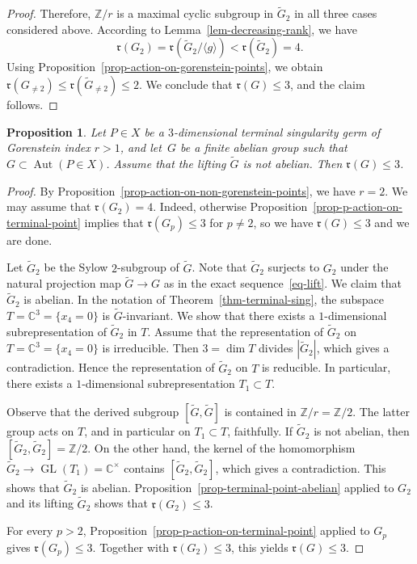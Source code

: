 \documentclass[11pt]{amsart}
\numberwithin{equation}{section}
\newtheorem{proposition}[thm]{Proposition}
\theoremstyle{definition}
\theoremstyle{remark}
\DeclareMathOperator{\Aut}{Aut}
\DeclareMathOperator{\GL}{GL}
\begin{document}
\begin{proof}
Therefore, $\mathbb{Z}/r$ is a maximal cyclic subgroup in $\widetilde{G}_2$ in all three cases considered above. According to Lemma~\ref{lem-decreasing-rank}, we have 
\[
\mathfrak{r}(G_2)=\mathfrak{r}\left(\widetilde{G}_2/\langle g\rangle\right)<\mathfrak{r}\left(\widetilde{G}_2\right)=4.
\] 
Using Proposition~\ref{prop-action-on-gorenstein-points}, we obtain $\mathfrak{r}(G_{\neq 2})\leq \mathfrak{r}(\widetilde{G}_{\neq 2})\leq 2$. We conclude that $\mathfrak{r}(G)\leq 3$, and the claim follows.
\end{proof}

\begin{proposition}
\label{prop-terminal-point-not-abelian}
Let $P\in X$ be a $3$-dimensional terminal singularity germ of Gorenstein index $r>1$, and let~$G$ be a finite abelian group such that $G\subset \Aut(P\in X)$. 
Assume that the lifting $\widetilde{G}$ is not abelian. Then
$\mathfrak{r}(G)\leq 3$.
\end{proposition}

\begin{proof}
By Proposition~\ref{prop-action-on-non-gorenstein-points}, we have $r=2$. 
We may assume that $\mathfrak{r}(G_2)=4$. Indeed, otherwise Proposition~\ref{prop-p-action-on-terminal-point} implies that $\mathfrak{r}(G_p)\leq 3$ for $p\neq 2$, so we have $\mathfrak{r}(G)\leq 3$ and we are done. 

Let $\widetilde{G}_2$ be the Sylow $2$-subgroup of $\widetilde{G}$. 
Note that $\widetilde{G}_2$ surjects to $G_2$ under the natural projection map $\widetilde{G}\to G$ as in the exact sequence~\eqref{eq-lift}. 
We claim that $\widetilde{G}_2$ is abelian. 
In the notation of Theorem~\ref{thm-terminal-sing}, the subspace $T=\mathbb{C}^3=\{x_4=0\}$ is $\widetilde{G}$-invariant. 
We show that there exists a $1$-dimensional subrepresentation of $\widetilde{G}_2$ in $T$. Assume that the representation of $\widetilde{G}_2$ on $T=\mathbb{C}^3=\{x_4=0\}$ is irreducible. Then $3=\dim T$ divides $|\widetilde{G}_2|$, which gives a contradiction. Hence the representation of $\widetilde{G}_2$ on $T$ is reducible. In particular, there exists a $1$-dimensional subrepresentation $T_1\subset T$. 

Observe that the derived subgroup $[\widetilde{G},\widetilde{G}]$ is contained in $\mathbb{Z}/r=\mathbb{Z}/2$. The latter group acts on $T$, and in particular on $T_1\subset T$, faithfully.   
If $\widetilde{G}_2$ is not abelian, then $[\widetilde{G}_2,\widetilde{G}_2]=\mathbb{Z}/2$.  
On the other hand, the kernel of the homomorphism $\widetilde{G}_2\to\GL(T_1)=\mathbb{C}^\times$ contains $[\widetilde{G}_2,\widetilde{G}_2]$, which gives a contradiction. This shows that $\widetilde{G}_2$ is abelian. Proposition~\ref{prop-terminal-point-abelian} applied to $G_2$ and its lifting $\widetilde{G}_2$ shows that $\mathfrak{r}(G_2)\leq 3$. 

For every $p>2$, Proposition~\ref{prop-p-action-on-terminal-point} applied to $G_p$ gives $\mathfrak r(G_p)\leq3$. Together with $\mathfrak r(G_2)\leq3$, this yields $\mathfrak r(G)\leq3$.
\end{proof}
\end{document}
